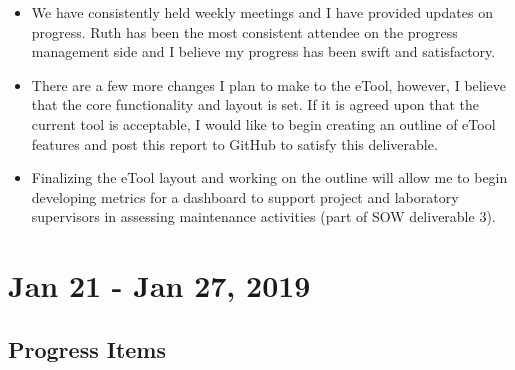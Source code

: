 \documentclass[]{article}
\providecommand{\tightlist}{%
  \setlength{\itemsep}{0pt}\setlength{\parskip}{0pt}}
\begin{document}
\begin{enumerate}
  \begin{itemize}
  \tightlist
  \item
    We have consistently held weekly meetings and I have provided
    updates on progress. Ruth has been the most consistent attendee on
    the progress management side and I believe my progress has been
    swift and satisfactory.
  \item
    There are a few more changes I plan to make to the eTool, however, I
    believe that the core functionality and layout is set. If it is
    agreed upon that the current tool is acceptable, I would like to
    begin creating an outline of eTool features and post this report to
    GitHub to satisfy this deliverable.
  \item
    Finalizing the eTool layout and working on the outline will allow me
    to begin developing metrics for a dashboard to support project and
    laboratory supervisors in assessing maintenance activities (part of
    SOW deliverable 3).
  \end{itemize}
\end{enumerate}

\hypertarget{jan-21---jan-27-2019}{%
\section{Jan 21 - Jan 27, 2019}\label{jan-21---jan-27-2019}}

\hypertarget{progress-items-9}{%
\subsection{Progress Items}\label{progress-items-9}}
\end{document}
